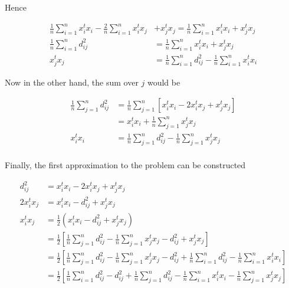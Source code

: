 \documentclass{article}
\begin{document}
    Hence

    \begin{equation*}
        \begin{aligned}
            \frac{1}{n} \sum_{i=1}^n x_i^t x_i - \frac{2}{n} \sum_{i=1}^n x_i^t x_j &+ x_j^t x_j 
            = 
            \frac{1}{n} \sum_{i=1}^n x_i^t x_i + x_j^t x_j\\
            \frac{1}{n} \sum_{i=1}^n d_{ij}^2
            &= 
            \frac{1}{n} \sum_{i=1}^n x_i^t x_i + x_j^t x_j\\
            x_j^t x_j &= \frac{1}{n} \sum_{i=1}^n d_{ij}^2 - \frac{1}{n} \sum_{i=1}^n x_i^t x_i
        \end{aligned}
    \end{equation*}

    Now in the other hand, the sum over $j$ would be

    \begin{equation*}
        \begin{aligned}
            \frac{1}{n} \sum_{j=1}^n d_{ij}^2
            &=
            \frac{1}{n} \sum_{j=1}^n [x_i^t x_i - 2 x_i^t x_j + x_j^t x_j]\\
            &= 
            x_i^t x_i + \frac{1}{n} \sum_{j=1}^n x_j^t x_j\\
            x_i^t x_i &= \frac{1}{n} \sum_{j=1}^n d_{ij}^2 - \frac{1}{n} \sum_{j=1}^n x_j^t x_j\\
        \end{aligned}
    \end{equation*}

    Finally, the first approximation to the problem can be constructed

    \begin{equation*}
        \begin{aligned}
            d_{ij}^2 &= x_i^t x_i - 2 x_i^t x_j + x_j^t x_j\\
            2 x_i^t x_j &= x_i^t x_i - d_{ij}^2 + x_j^t x_j\\
            x_i^t x_j &= \frac{1}{2} (x_i^t x_i - d_{ij}^2 + x_j^t x_j)\\
            &=
            \frac{1}{2} \left[ \frac{1}{n} \sum_{j=1}^n d_{ij}^2 - \frac{1}{n} \sum_{j=1}^n x_j^t x_j - d_{ij}^2 + x_j^t x_j \right]\\
            &=
            \frac{1}{2} \left[ \frac{1}{n} \sum_{j=1}^n d_{ij}^2 - \frac{1}{n} \sum_{j=1}^n x_j^t x_j - d_{ij}^2 + \frac{1}{n} \sum_{i=1}^n d_{ij}^2 - \frac{1}{n} \sum_{i=1}^n x_i^t x_i \right]\\
            &=
            \frac{1}{2} \left[ \frac{1}{n} \sum_{i=1}^n d_{ij}^2 - d_{ij}^2 + \frac{1}{n} \sum_{j=1}^n d_{ij}^2 - \frac{1}{n} \sum_{i=1}^n x_i^t x_i - \frac{1}{n} \sum_{j=1}^n x_j^t x_j \right]\\
        \end{aligned}
    \end{equation*}
\end{document}
